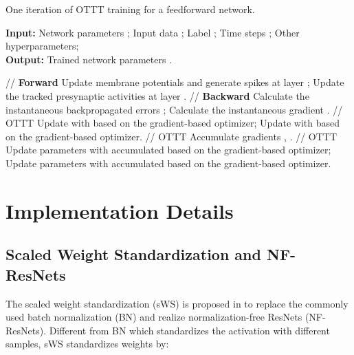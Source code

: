 \documentclass{article}
\begin{document}
\begin{algorithm}[h]
    \caption{One iteration of OTTT training for a feedforward network.}
    \hspace*{0.02in} {\bf Input:}
    Network parameters ; Input data ; Label ; Time steps ; Other hyperparameters;\\
    \hspace*{0.02in} {\bf Output:}
    Trained network parameters .\\
    \begin{algorithmic}[1]
    \For{}
        \For{} \quad // {\bf Forward}
            \State Update membrane potentials  and generate spikes  at layer ;
            \State Update the tracked presynaptic activities  at layer .
        \EndFor
        \For{} \quad // {\bf Backward}
            \State Calculate the instantaneous backpropagated errors ;
            \State Calculate the instantaneous gradient .
         \quad // OTTT
            \State Update  with  based on the gradient-based optimizer;
            \State Update  with  based on the gradient-based optimizer.
        \Else \quad // OTTT
            \State Accumulate gradients , .
        \EndIf
        \EndFor
    \EndFor
     \quad // OTTT
        \State Update parameters  with accumulated  based on the gradient-based optimizer;
        \State Update parameters  with accumulated  based on the gradient-based optimizer.
    \EndIf
    \end{algorithmic}
    \label{algorithm: ottt}
\end{algorithm}

\section{Implementation Details}

\subsection{Scaled Weight Standardization and NF-ResNets}

The scaled weight standardization (sWS) is proposed in \cite{brock2021characterizing,brock2021high} to replace the commonly used batch normalization (BN) and realize normalization-free ResNets (NF-ResNets). Different from BN which standardizes the activation with different samples, sWS standardizes weights by:
\end{document}
